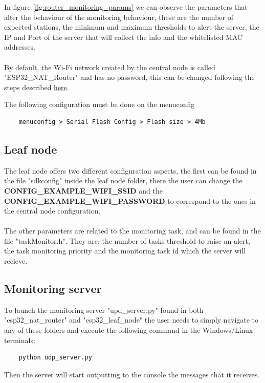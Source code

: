 In figure \ref{fig:router_monitoring_params} we can observe the parameters that alter the behaviour of the monitoring behaviour, these are the number of expected stations, the minimum and maximum thresholds to alert the server, the IP and Port of the server that will collect the info and the whitelisted MAC addresses.
\\~\\
By default, the Wi-Fi network created by the central node is called "ESP32\_NAT\_Router" and has no password, this can be changed following the steps described \hyperlink{https://github.com/martin-ger/esp32_nat_router}{here}.

The following configuration must be done on the menuconfig

\begin{verbatim}
    menuconfig > Serial Flash Config > Flash size > 4Mb
\end{verbatim}


\subsection{Leaf node}
The leaf node offers two different configuration aspects, the first can be found in the file "sdkconfig" inside the leaf node folder, there the user can change the \textbf{CONFIG\_EXAMPLE\_WIFI\_SSID} and the \textbf{CONFIG\_EXAMPLE\_WIFI\_PASSWORD} to correspond to the ones in the central node configuration.
\\~\\
The other parameters are related to the monitoring task, and can be found in the file "taskMonitor.h". They are; the number of tasks threshold to raise an alert, the task monitoring priority and the monitoring task id which the server will recieve.



\subsection{Monitoring server}
To launch the monitoring server "upd\_server.py" found in both "esp32\_nat\_router" and "esp32\_leaf\_node" the user needs to simply navigate to any of these folders and execute the following command in the Windows/Linux terminals:

\begin{verbatim}
    python udp_server.py
\end{verbatim}

Then the server will start outputting to the console the messages that it receives.


